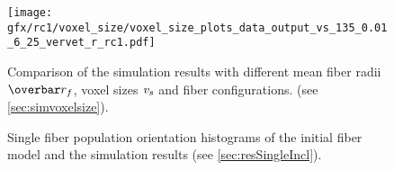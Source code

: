 %
\begin{figure}[!p]
\centering
\texttt{[image: gfx/rc1/voxel\_size/voxel\_size\_plots\_data\_output\_vs\_135\_0.01\_6\_25\_vervet\_r\_rc1.pdf]}
\caption[]{Comparison of the simulation results with different mean fiber radii $\fiberRadiusMean$, voxel sizes $\textnormal{$\mathit{v_{s}}$}$ and fiber configurations. (see \cref{sec:simvoxelsize}).}
\label{app:voxelsizeNoise}
\end{figure}
%
%
%
%
%
\begin{figure}[!p]
\centering
%
\caption[]{Single fiber population orientation histograms of the initial fiber model and the simulation results (see \cref{sec:resSingleIncl}).}
\label{app:single_fiber_pop_hist}
\end{figure}
%
%
%
